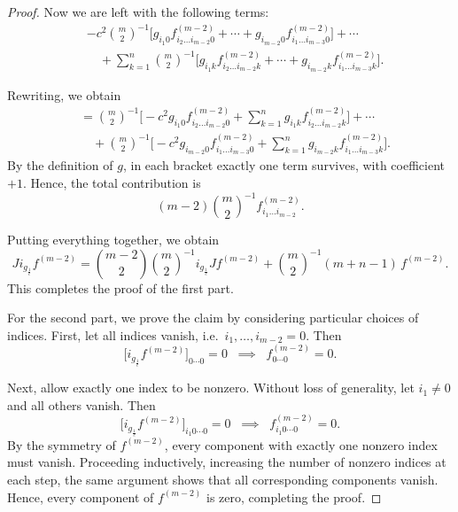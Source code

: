 \documentclass[10pt,a4paper]{amsart}
\newcommand{\gc}{i_{g_{\frac{1}{c}}}}
\begin{document}
\begin{proof}
		Now we are left with the following terms:
		\[
		\begin{aligned}
			&-c^2 \binom{m}{2}^{-1} 
			\Big[ g_{i_1 0} f^{(m-2)}_{i_2 \dots i_{m-2} 0} 
			+ \cdots 
			+ g_{i_{m-2} 0} f^{(m-2)}_{i_1 \dots i_{m-3} 0} \Big] 
			+ \cdots \\ 
			&\quad + \sum_{k=1}^{n} \binom{m}{2}^{-1} 
			\Big[ g_{i_1 k} f^{(m-2)}_{i_2 \dots i_{m-2} k} 
			+ \cdots 
			+ g_{i_{m-2} k} f^{(m-2)}_{i_1 \dots i_{m-3} k} \Big].
		\end{aligned}
		\]
		
		Rewriting, we obtain
		\[
		\begin{aligned}
			&= \binom{m}{2}^{-1} \Big[ -c^2 g_{i_1 0} f^{(m-2)}_{i_2 \dots i_{m-2} 0} 
			+ \sum_{k=1}^n g_{i_1 k} f^{(m-2)}_{i_2 \dots i_{m-2} k} \Big] + \cdots \\
			&\quad + \binom{m}{2}^{-1} \Big[ -c^2 g_{i_{m-2} 0} f^{(m-2)}_{i_1 \dots i_{m-3} 0} 
			+ \sum_{k=1}^n g_{i_{m-2} k} f^{(m-2)}_{i_1 \dots i_{m-3} k} \Big].
		\end{aligned}
		\]
		By the definition of \(g\), in each bracket exactly one term survives, with coefficient \(+1\). Hence, the total contribution is
		\[
		(m-2)\binom{m}{2}^{-1} f^{(m-2)}_{i_1 \dots i_{m-2}}.
		\]
		
		Putting everything together, we obtain
		\[
		J \gc f^{(m-2)} 
		= \binom{m-2}{2}\binom{m}{2}^{-1} \gc J f^{(m-2)} 
		+ \binom{m}{2}^{-1} (m+n-1) \,f^{(m-2)}.
		\]
		This completes the proof of the first part.
		
		For the second part, we prove the claim by considering particular choices of indices.  
		First, let all indices vanish, i.e.\ \(i_1, \dots, i_{m-2} = 0\). Then  
		\[
		\big[ \gc f^{(m-2)} \big]_{0 \cdots 0} = 0 
		\;\;\implies\;\; f^{(m-2)}_{0 \cdots 0} = 0.
		\]
		
		Next, allow exactly one index to be nonzero. Without loss of generality, let \(i_1 \neq 0\) and all others vanish. Then  
		\[
		\big[ \gc f^{(m-2)} \big]_{i_1 0 \cdots 0} = 0 
		\;\;\implies\;\; f^{(m-2)}_{i_1 0 \cdots 0} = 0.
		\]
		By the symmetry of \(f^{(m-2)}\), every component with exactly one nonzero index must vanish. Proceeding inductively, increasing the number of nonzero indices at each step, the same argument shows that all corresponding components vanish. Hence, every component of \(f^{(m-2)}\) is zero, completing the proof.
	\end{proof}
\end{document}
